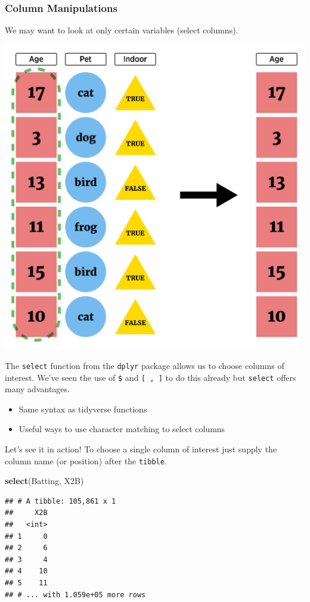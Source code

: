 \documentclass[
]{book}
\newenvironment{Shaded}{\begin{snugshade}}{\end{snugshade}}
\newcommand{\KeywordTok}[1]{\textcolor[rgb]{0.13,0.29,0.53}{\textbf{#1}}}
\newcommand{\NormalTok}[1]{#1}
\theoremstyle{definition}
\theoremstyle{definition}
\theoremstyle{definition}
\theoremstyle{remark}
\begin{document}
\hypertarget{column-manipulations}{%
\subsubsection{Column Manipulations}\label{column-manipulations}}

We may want to look at only certain variables (select columns).

\begin{center}\includegraphics[width=0.65\linewidth]{img/selectVisualF} \end{center}

The \texttt{select} function from the \texttt{dplyr} package allows us to choose columns of interest. We've seen the use of \texttt{\$} and \texttt{{[}\ ,\ {]}} to do this already but \texttt{select} offers many advantages.

\begin{itemize}
\item
  Same syntax as tidyverse functions
\item
  Useful ways to use character matching to select columns
\end{itemize}

Let's see it in action! To choose a single column of interest just supply the column name (or position) after the \texttt{tibble}.

\begin{Shaded}
\begin{Highlighting}[]
\KeywordTok{select}\NormalTok{(Batting, X2B)}
\end{Highlighting}
\end{Shaded}

\begin{verbatim}
## # A tibble: 105,861 x 1
##     X2B
##   <int>
## 1     0
## 2     6
## 3     4
## 4    10
## 5    11
## # ... with 1.059e+05 more rows
\end{verbatim}
\end{document}
